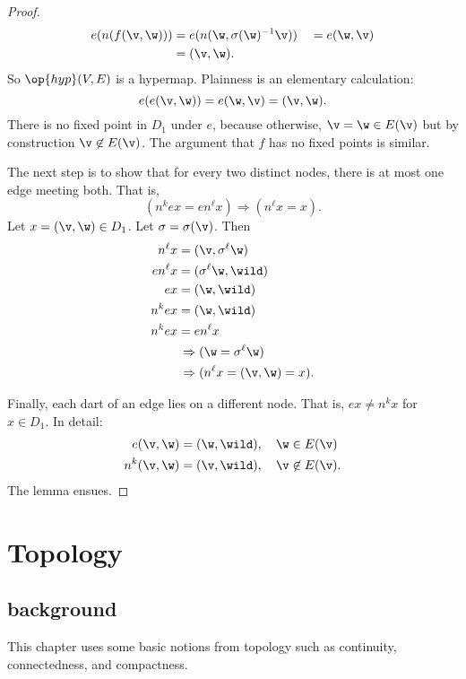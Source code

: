 \begin{proof}  
\begin{alignat*}{6}
e(n(f(\v,\w))) &= e(n(\w,\sigma(\w)^{-1} \v)) &&=
e(\w,\v)\\ 
&= (\v,\w).
\end{alignat*}
So $\op{hyp}(V,E)$ is a hypermap. 
Plainness is an elementary calculation:
\[ e(e(\v,\w)) = e(\w,\v) = (\v,\w).\] 
There is no fixed point in $D_1$ under $e$, because otherwise, $\v = \w\in E(\v)$
but by construction $\v\not\in E(\v)$.  The argument that $f$ has no
fixed points is similar.

The next step is to show that for every two distinct nodes, there
is at most one edge meeting both.  That is,
\[ (n^k e x = e n^\ell x)\Rightarrow (n^\ell x =
x).\]  Let $x = (\v,\w)\in D_1$.  Let
$\sigma=\sigma(\v)$. Then
\begin{align*}
n^\ell x &= (\v,\sigma^\ell \w)\\
e n^\ell x &= (\sigma^\ell \w,\wild )\\
e x &= (\w,\wild )\\
n^k e x &= (\w,\wild )\\
n^k e x &= e n^\ell x \\&\,\Rightarrow (\w = \sigma^\ell \w) \\&\,\Rightarrow
(n^\ell x = (\v,\w) = x).
\end{align*}

Finally,  each dart of an edge lies on a different node.
That is, $e x \ne n^k x$ for $x\in D_1$.   In detail:
\begin{align*}
e(\v,\w) &= (\w,\wild ),\quad \w\in E(\v)\\
n^k(\v,\w) &= (\v,\wild ),\quad \v\not\in E(\v).
\end{align*}
The lemma ensues.
\end{proof}

\section{Topology}\label{sec:topology}

\subsection{background}

This chapter uses some basic
notions from topology such as continuity, connectedness, and compactness.

